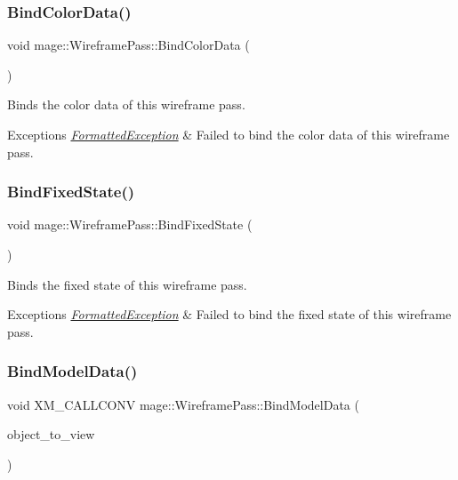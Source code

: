 \subsubsection{\texorpdfstring{Bind\+Color\+Data()}{BindColorData()}}
{\footnotesize\ttfamily void mage\+::\+Wireframe\+Pass\+::\+Bind\+Color\+Data (\begin{DoxyParamCaption}{ }\end{DoxyParamCaption})\hspace{0.3cm}{\ttfamily [private]}}

Binds the color data of this wireframe pass.


\begin{DoxyExceptions}{Exceptions}
{\em \hyperlink{structmage_1_1_formatted_exception}{Formatted\+Exception}} & Failed to bind the color data of this wireframe pass. \\
\hline
\end{DoxyExceptions}
\hypertarget{classmage_1_1_wireframe_pass_abf99690ae099ed0ba0ca35c5d87ac0ef}{}\label{classmage_1_1_wireframe_pass_abf99690ae099ed0ba0ca35c5d87ac0ef} 
\subsubsection{\texorpdfstring{Bind\+Fixed\+State()}{BindFixedState()}}
{\footnotesize\ttfamily void mage\+::\+Wireframe\+Pass\+::\+Bind\+Fixed\+State (\begin{DoxyParamCaption}{ }\end{DoxyParamCaption})}

Binds the fixed state of this wireframe pass.


\begin{DoxyExceptions}{Exceptions}
{\em \hyperlink{structmage_1_1_formatted_exception}{Formatted\+Exception}} & Failed to bind the fixed state of this wireframe pass. \\
\hline
\end{DoxyExceptions}
\hypertarget{classmage_1_1_wireframe_pass_a6e316eaabf3afb71162490c1f3c244f3}{}\label{classmage_1_1_wireframe_pass_a6e316eaabf3afb71162490c1f3c244f3} 
\subsubsection{\texorpdfstring{Bind\+Model\+Data()}{BindModelData()}}
{\footnotesize\ttfamily void X\+M\+\_\+\+C\+A\+L\+L\+C\+O\+NV mage\+::\+Wireframe\+Pass\+::\+Bind\+Model\+Data (\begin{DoxyParamCaption}\item[{F\+X\+M\+M\+A\+T\+R\+IX}]{object\+\_\+to\+\_\+view }\end{DoxyParamCaption})\hspace{0.3cm}{\ttfamily [private]}}

